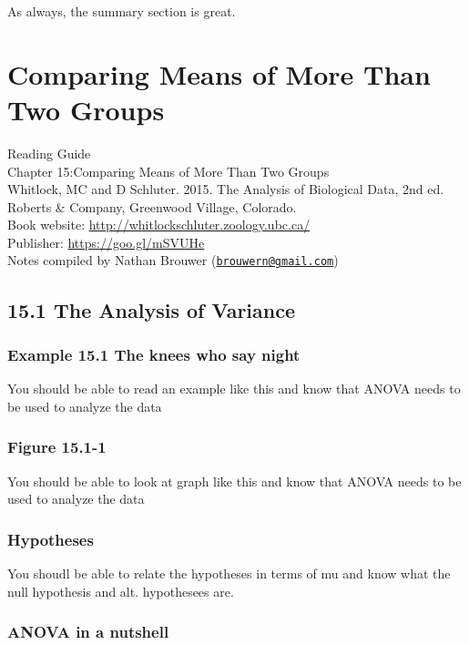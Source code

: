 \documentclass[]{book}
\theoremstyle{definition}
\theoremstyle{definition}
\theoremstyle{definition}
\theoremstyle{remark}
\begin{document}
As always, the summary section is great.

\chapter{Comparing Means of More Than Two
Groups}\label{comparing-means-of-more-than-two-groups}

Reading Guide\\
Chapter 15:Comparing Means of More Than Two Groups\\
Whitlock, MC and D Schluter. 2015. The Analysis of Biological Data, 2nd
ed. Roberts \& Company, Greenwood Village, Colorado.\\
Book website: \url{http://whitlockschluter.zoology.ubc.ca/}\\
Publisher: \url{https://goo.gl/mSVUHe}\\
Notes compiled by Nathan Brouwer
(\href{mailto:brouwern@gmail.com}{\nolinkurl{brouwern@gmail.com}})

\section{15.1 The Analysis of Variance}\label{the-analysis-of-variance}

\subsection{Example 15.1 The knees who say
night}\label{example-15.1-the-knees-who-say-night}

You should be able to read an example like this and know that ANOVA
needs to be used to analyze the data

\subsection{Figure 15.1-1}\label{figure-15.1-1}

You should be able to look at graph like this and know that ANOVA needs
to be used to analyze the data

\subsection{Hypotheses}\label{hypotheses-1}

You shoudl be able to relate the hypotheses in terms of mu and know what
the null hypothesis and alt. hypothesees are.

\subsection{ANOVA in a nutshell}\label{anova-in-a-nutshell}
\end{document}
